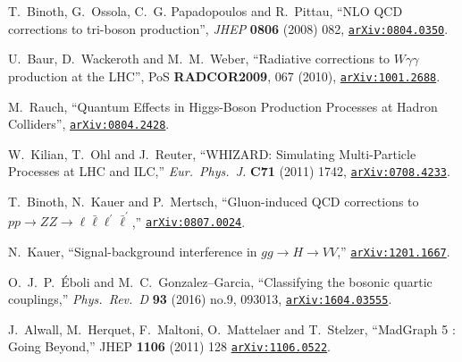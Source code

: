 \documentclass[english,12pt]{article}
\begin{document}
\begin{thebibliography}{10}
T.~Binoth, G.~Ossola, C.~G. Papadopoulos and R.~Pittau, ``{NLO QCD corrections
  to tri-boson production}'', {\em JHEP} {\bf 0806} (2008) 082,
\href{https://www.arXiv.org/abs/0804.0350}{{\tt arXiv:0804.0350}}.

  U.~Baur, D.~Wackeroth and M.~M.~Weber,
  ``{Radiative corrections to $W \gamma \gamma$ production at the LHC}'',
  PoS {\bf RADCOR2009}, 067 (2010),
\href{https://www.arXiv.org/abs/1001.2688}{{\tt arXiv:1001.2688}}.

  M.~Rauch,
  ``Quantum Effects in Higgs-Boson Production Processes at Hadron Colliders'',
 \href{https://arxiv.org/abs/0804.2428}{{\tt arXiv:0804.2428}}.

  W.~Kilian, T.~Ohl and J.~Reuter,
  ``WHIZARD: Simulating Multi-Particle Processes at LHC and ILC,''
  {\em Eur.\ Phys.\ J.} {\bf C71} (2011) 1742,
 \href{https://arxiv.org/abs/0708.4233}{{\tt arXiv:0708.4233}}.

  T.~Binoth, N.~Kauer and P.~Mertsch,
  ``Gluon-induced QCD corrections to $pp \rightarrow ZZ \rightarrow \ell \bar{\ell} \ell^{'} \bar{\ell}^{'}$,''
  \href{https://arXiv.org/abs/0807.0024}{{\tt arXiv:0807.0024}}.
  
  N.~Kauer,
  ``Signal-background interference in $gg \rightarrow H \rightarrow VV$,''
  \href{https://arXiv.org/abs/1201.1667} {{\tt arXiv:1201.1667}}.

  O.~J.~P.~Éboli and M.~C.~Gonzalez–Garcia,
  ``Classifying the bosonic quartic couplings,''
  {\em Phys.\ Rev.\ D} {\bf 93} (2016) no.9,  093013,
  \href{https://arXiv.org/abs/1604.03555} {{\tt arXiv:1604.03555}}.

  J.~Alwall, M.~Herquet, F.~Maltoni, O.~Mattelaer and T.~Stelzer,
  ``MadGraph 5 : Going Beyond,''
  JHEP {\bf 1106} (2011) 128
  \href{https://arXiv.org/abs/1106.0522}{\tt arXiv:1106.0522}.

\end{thebibliography}\endgroup
\end{document}
